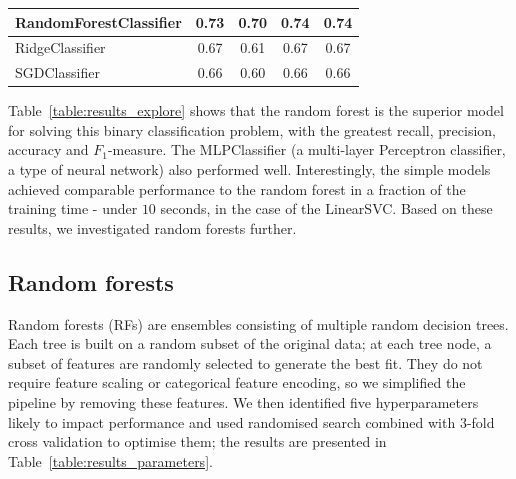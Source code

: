 \documentclass[12pt,a4paper]{article}
\begin{document}
\begin{table}[htb]
\begin{tabular}{|p{5cm}|c|c|c|c|}
\textbf{RandomForestClassifier} & \textbf{0.73}                     & \textbf{0.70}                      & \textbf{0.74}                     & \textbf{0.74}                      \\ \hline
RidgeClassifier                 & 0.67                              & 0.61                               & 0.67                              & 0.67                               \\ \hline
SGDClassifier                   & 0.66                              & 0.60                               & 0.66                              & 0.66                               \\ \hline
\end{tabular}
\end{table}

Table~\ref{table:results_explore} shows that the random forest is the superior model for solving this binary classification problem, with the greatest recall, precision, accuracy and $F_1$-measure. The MLPClassifier (a multi-layer Perceptron classifier, a type of neural network) also performed well. Interestingly, the simple models achieved comparable performance to the random forest in a fraction of the training time - under $10$ seconds, in the case of the LinearSVC.  Based on these results, we investigated random forests further.

\subsection{Random forests}

Random forests (RFs) are ensembles consisting of multiple random decision trees. Each tree is built on a random subset of the original data; at each tree node, a subset of features are randomly selected to generate the best fit. They do not require feature scaling or categorical feature encoding, so we simplified the pipeline by removing these features. We then identified five hyperparameters likely to impact performance and used randomised search combined with $3$-fold cross validation to optimise them; the results are presented in Table~\ref{table:results_parameters}.
\end{document}
